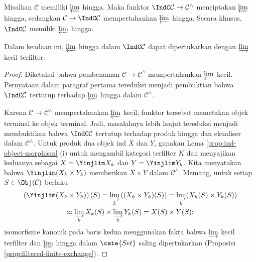 \begin{lemma}\label{prop:Ind-lim}
	Misalkan $\mathcal{C}$ memiliki $\varprojlim$ hingga. Maka funktor $\IndC\mathcal{C} \to \mathcal{C}^\wedge$ menciptakan $\varprojlim$ hingga, sedangkan $\mathcal{C} \to \IndC\mathcal{C}$ mempertahankan $\varprojlim$ hingga. Secara khusus, $\IndC\mathcal{C}$ memiliki $\varprojlim$ hingga.
	
	Dalam keadaan ini, $\varprojlim$ hingga dalam $\IndC\mathcal{C}$ dapat dipertukarkan dengan $\varinjlim$ kecil terfilter.
\end{lemma}
\begin{proof}
	Diketahui bahwa pembenaman $\mathcal{C} \to \mathcal{C}^\wedge$ mempertahankan $\varprojlim$ kecil. Pernyataan dalam paragraf pertama tereduksi menjadi pembuktian bahwa $\IndC\mathcal{C}$ tertutup terhadap $\varprojlim$ hingga dalam $\mathcal{C}^\wedge$.
	
	Karena $\mathcal{C} \to \mathcal{C}^\wedge$ mempertahankan $\varprojlim$ kecil, funktor tersebut memetakan objek terminal ke objek terminal. Jadi, masalahnya lebih lanjut tereduksi menjadi membuktikan bahwa $\IndC\mathcal{C}$ tertutup terhadap produk hingga dan ekualiser dalam $\mathcal{C}^\wedge$. Untuk produk dua objek ind $X$ dan $Y$, gunakan Lema \ref{prop:ind-object-morphism} (i) untuk mengambil kategori terfilter $K$ dan menyajikan keduanya sebagai $X = \Yinjlim X_k$ dan $Y = \Yinjlim Y_k$. Kita menyatakan bahwa $\Yinjlim (X_k \times Y_k)$ memberikan $X \times Y$ dalam $\mathcal{C}^\wedge$. Memang, untuk setiap $S \in \Obj(\mathcal{C})$ berlaku
	\begin{multline*}
		\left(\Yinjlim (X_k \times Y_k)\right)(S) = \varinjlim_k \left((X_k \times Y_k)(S)\right) = \varinjlim_k (X_k(S) \times Y_k(S)) \\
		\simeq \varinjlim_k X_k(S) \times \varinjlim_k Y_k(S) = X(S) \times Y(S);
	\end{multline*}
	isomorfisme kanonik pada baris kedua menggunakan fakta bahwa $\varinjlim$ kecil terfilter dan $\varprojlim$ hingga dalam $\cate{Set}$ saling dipertukarkan (Proposisi \ref{prop:filtered-finite-exchange}).
	

\end{proof}
